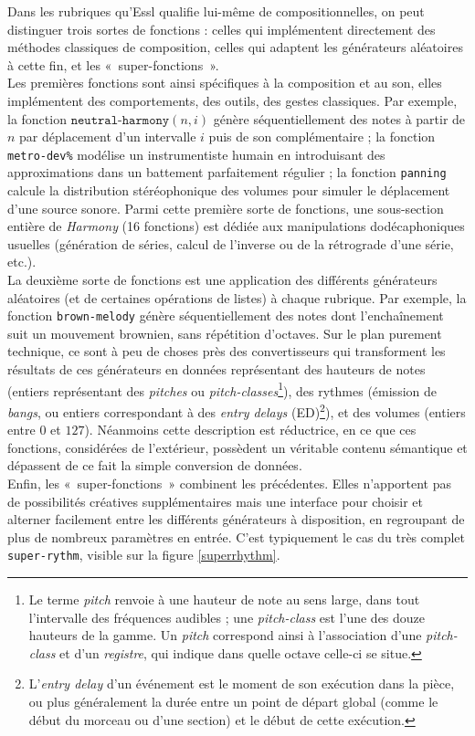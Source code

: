 \documentclass[a4paper,12pt]{article}
\newcommand{\guill}[1]{«~#1~»}
\begin{document}
Dans les rubriques qu'Essl qualifie lui-même de compositionnelles, on peut distinguer trois sortes de fonctions : celles qui implémentent directement des méthodes classiques de composition, celles qui adaptent les générateurs aléatoires à cette fin, et les \guill{super-fonctions}. \\
Les premières fonctions sont ainsi spécifiques à la composition et au son, elles implémentent des comportements, des outils, des gestes classiques. Par exemple, la fonction $\texttt{neutral-harmony}(n,i)$ génère séquentiellement des notes à partir de $n$ par déplacement d'un intervalle $i$ puis de son complémentaire ; la fonction \texttt{metro-dev\%} modélise un instrumentiste humain en introduisant des approximations dans un battement parfaitement régulier ; la fonction \texttt{panning} calcule la distribution stéréophonique des volumes pour simuler le déplacement d'une source sonore. Parmi cette première sorte de fonctions, une sous-section entière de \emph{Harmony} (16 fonctions) est dédiée aux manipulations dodécaphoniques usuelles (génération de séries, calcul de l'inverse ou de la rétrograde d'une série, etc.). \\
La deuxième sorte de fonctions est une application des différents générateurs aléatoires (et de certaines opérations de listes) à chaque rubrique. Par exemple, la fonction \texttt{brown-melody} génère séquentiellement des notes dont l'enchaînement suit un mouvement brownien, sans répétition d'octaves. Sur le plan purement technique, ce sont à peu de choses près des convertisseurs qui transforment les résultats de ces générateurs en données représentant des hauteurs de notes (entiers représentant des \emph{pitches} ou \emph{pitch-classes}\footnote{Le terme \emph{pitch} renvoie à une hauteur de note au sens large, dans tout l'intervalle des fréquences audibles ; une \emph{pitch-class} est l'une des douze hauteurs de la gamme. Un \emph{pitch} correspond ainsi à l'association d'une \emph{pitch-class} et d'un \emph{registre}, qui indique dans quelle octave celle-ci se situe.}), des rythmes (émission de \emph{bangs}, ou entiers correspondant à des \emph{entry delays} (ED)\footnote{L'\emph{entry delay} d'un événement est le moment de son exécution dans la pièce, ou plus généralement la durée entre un point de départ global (comme le début du morceau ou d'une section) et le début de cette exécution.}), et des volumes (entiers entre $0$ et $127$). Néanmoins cette description est réductrice, en ce que ces fonctions, considérées de l'extérieur, possèdent un véritable contenu sémantique et dépassent de ce fait la simple conversion de données. \\
Enfin, les \guill{super-fonctions} combinent les précédentes. Elles n'apportent pas de possibilités créatives supplémentaires mais une interface pour choisir et alterner facilement entre les différents générateurs à disposition, en regroupant de plus de nombreux paramètres en entrée. C'est typiquement le cas du très complet \texttt{super-rythm}, visible sur la figure \ref{superrhythm}.
\end{document}
